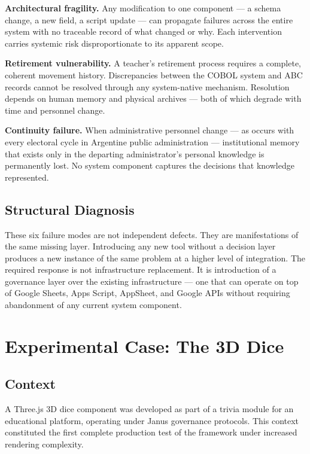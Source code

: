 \documentclass[conference]{IEEEtran}
\begin{document}
\medskip
\noindent\textbf{Architectural fragility.} Any modification to one component --- a schema change, a new field, a script update --- can propagate failures across the entire system with no traceable record of what changed or why. Each intervention carries systemic risk disproportionate to its apparent scope.

\medskip
\noindent\textbf{Retirement vulnerability.} A teacher's retirement process requires a complete, coherent movement history. Discrepancies between the COBOL system and ABC records cannot be resolved through any system-native mechanism. Resolution depends on human memory and physical archives --- both of which degrade with time and personnel change.

\medskip
\noindent\textbf{Continuity failure.} When administrative personnel change --- as occurs with every electoral cycle in Argentine public administration --- institutional memory that exists only in the departing administrator's personal knowledge is permanently lost. No system component captures the decisions that knowledge represented.

\subsection{Structural Diagnosis}

These six failure modes are not independent defects. They are manifestations of the same missing layer. Introducing any new tool without a decision layer produces a new instance of the same problem at a higher level of integration. The required response is not infrastructure replacement. It is introduction of a governance layer over the existing infrastructure --- one that can operate on top of Google Sheets, Apps Script, AppSheet, and Google APIs without requiring abandonment of any current system component.

\section{Experimental Case: The 3D Dice}

\subsection{Context}

A Three.js 3D dice component was developed as part of a trivia module for an educational platform, operating under Janus governance protocols. This context constituted the first complete production test of the framework under increased rendering complexity.
\end{document}
